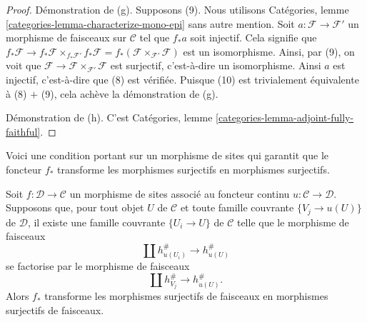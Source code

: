 \begin{proof}
\medskip\noindent
Démonstration de (g). Supposons (9). Nous utilisons
Catégories, lemme \ref{categories-lemma-characterize-mono-epi}
sans autre mention. Soit $a : \mathcal{F} \to \mathcal{F}'$ un morphisme
de faisceaux sur $\mathcal{C}$ tel que $f_*a$ soit injectif. Cela signifie que
$f_*\mathcal{F} \to f_*\mathcal{F} \times_{f_*\mathcal{F}'} f_*\mathcal{F} =
f_*(\mathcal{F} \times_{\mathcal{F}'} \mathcal{F})$ est un isomorphisme.
Ainsi, par (9), on voit que
$\mathcal{F} \to \mathcal{F} \times_{\mathcal{F}'} \mathcal{F}$ est
surjectif, c’est-à-dire un isomorphisme. Ainsi $a$ est injectif, c’est-à-dire que (8) est vérifiée.
Puisque (10) est trivialement équivalente à (8) $+$ (9), cela achève la démonstration de (g).

\medskip\noindent
Démonstration de (h). C’est
Catégories, lemme \ref{categories-lemma-adjoint-fully-faithful}.
\end{proof}

\noindent
Voici une condition portant sur un morphisme de sites qui garantit que
le foncteur $f_*$ transforme les morphismes surjectifs en morphismes surjectifs.

\begin{lemma}
\label{lemma-weaker}
Soit $f : \mathcal{D} \to \mathcal{C}$ un morphisme de sites associé au
foncteur continu $u : \mathcal{C} \to \mathcal{D}$.
Supposons que, pour tout objet $U$ de $\mathcal{C}$ et toute famille couvrante
$\{V_j \to u(U)\}$ de $\mathcal{D}$, il existe une famille couvrante $\{U_i \to U\}$
de $\mathcal{C}$ telle que le morphisme de faisceaux
$$
\coprod h_{u(U_i)}^\# \to h_{u(U)}^\#
$$
se factorise par le morphisme de faisceaux
$$
\coprod h_{V_j}^\# \to h_{u(U)}^\#.
$$
Alors $f_*$ transforme les morphismes surjectifs de faisceaux en morphismes surjectifs de
faisceaux.
\end{lemma}

